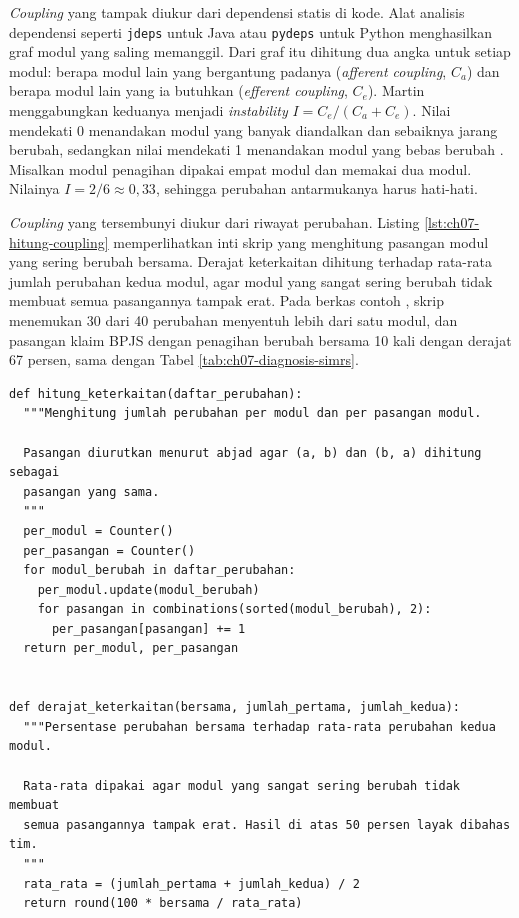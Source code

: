 \begin{pendalaman}[title={Pendalaman Teknis (opsional): Mengukur Coupling pada Basis Kode}]
  \textit{Coupling} yang tampak diukur dari dependensi statis di kode. Alat analisis dependensi
  seperti \texttt{jdeps} untuk Java atau \texttt{pydeps} untuk Python menghasilkan graf modul
  yang saling memanggil. Dari graf itu dihitung dua angka untuk setiap modul: berapa modul lain
  yang bergantung padanya (\textit{afferent coupling}, $C_a$) dan berapa modul lain yang ia
  butuhkan (\textit{efferent coupling}, $C_e$). Martin menggabungkan keduanya menjadi
  \textit{instability} $I = C_e / (C_a + C_e)$. Nilai mendekati 0 menandakan modul yang banyak
  diandalkan dan sebaiknya jarang berubah, sedangkan nilai mendekati 1 menandakan modul yang
  bebas berubah \cite{c07-martin2003}. Misalkan modul penagihan dipakai empat modul dan memakai
  dua modul. Nilainya $I = 2/6 \approx 0{,}33$, sehingga perubahan antarmukanya harus hati-hati.

  \textit{Coupling} yang tersembunyi diukur dari riwayat perubahan. Listing
  \ref{lst:ch07-hitung-coupling} memperlihatkan inti skrip yang menghitung pasangan modul yang
  sering berubah bersama. Derajat keterkaitan dihitung terhadap rata-rata jumlah perubahan kedua
  modul, agar modul yang sangat sering berubah tidak membuat semua pasangannya tampak erat. Pada
  berkas contoh , skrip menemukan 30 dari 40
  perubahan menyentuh lebih dari satu modul, dan pasangan klaim BPJS dengan penagihan berubah
  bersama 10 kali dengan derajat 67 persen, sama dengan Tabel \ref{tab:ch07-diagnosis-simrs}.

\begin{lstlisting}[style=ch07python, caption={Inti penghitung keterkaitan perubahan, tersedia di \berkas{sources/chapter07/hitung-coupling.py}}, label={lst:ch07-hitung-coupling}]
def hitung_keterkaitan(daftar_perubahan):
  """Menghitung jumlah perubahan per modul dan per pasangan modul.

  Pasangan diurutkan menurut abjad agar (a, b) dan (b, a) dihitung sebagai
  pasangan yang sama.
  """
  per_modul = Counter()
  per_pasangan = Counter()
  for modul_berubah in daftar_perubahan:
    per_modul.update(modul_berubah)
    for pasangan in combinations(sorted(modul_berubah), 2):
      per_pasangan[pasangan] += 1
  return per_modul, per_pasangan


def derajat_keterkaitan(bersama, jumlah_pertama, jumlah_kedua):
  """Persentase perubahan bersama terhadap rata-rata perubahan kedua modul.

  Rata-rata dipakai agar modul yang sangat sering berubah tidak membuat
  semua pasangannya tampak erat. Hasil di atas 50 persen layak dibahas tim.
  """
  rata_rata = (jumlah_pertama + jumlah_kedua) / 2
  return round(100 * bersama / rata_rata)
\end{lstlisting}
\end{pendalaman}

